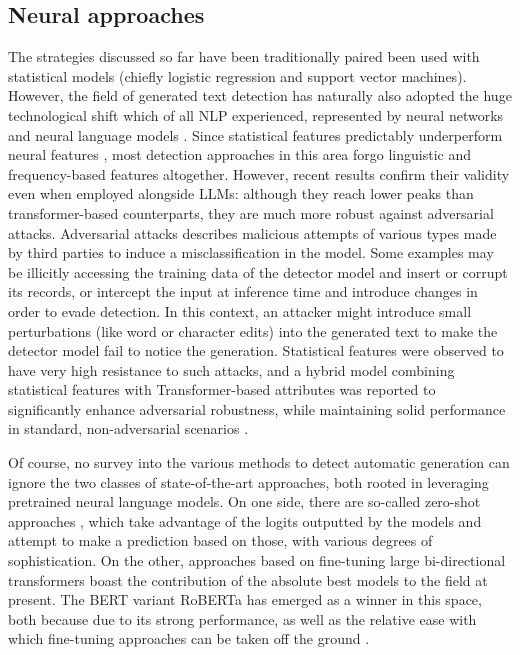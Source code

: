\subsection{Neural approaches}

The strategies discussed so far have been traditionally paired been used with statistical models (chiefly logistic regression and support vector machines).
However, the field of generated text detection has naturally also adopted the huge technological shift which of all NLP experienced, represented by neural networks and neural language models \citep{papers2024nlp}.
Since statistical features predictably underperform neural features \citep{crothers2022adversarial}, most detection approaches in this area forgo linguistic and frequency-based features altogether.
However, recent results confirm their validity even when employed alongside LLMs: although they reach lower peaks than transformer-based counterparts, they are much more robust against adversarial attacks.
Adversarial attacks describes malicious attempts of various types made by third parties to induce a misclassification in the model.
Some examples may be illicitly accessing the training data of the detector model and insert or corrupt its records, or intercept the input at inference time and introduce changes in order to evade detection.
In this context, an attacker might introduce small perturbations (like word or character edits) into the generated text to make the detector model fail to notice the generation.
Statistical features were observed to have very high resistance to such attacks, and a hybrid model combining statistical features with Transformer-based attributes was reported to significantly enhance adversarial robustness, while maintaining solid performance in standard, non-adversarial scenarios \citep{crothers2022adversarial}.

Of course, no survey into the various methods to detect automatic generation can ignore the two classes of state-of-the-art approaches, both rooted in leveraging pretrained neural language models.
On one side, there are so-called zero-shot approaches \citep{zellers2020defendingneuralfakenews}, which take advantage of the logits outputted by the models and attempt to make a prediction based on those, with various degrees of sophistication.
On the other, approaches based on fine-tuning large bi-directional transformers \citep{solaiman2019release} boast the contribution of the absolute best models to the field at present.
The BERT variant RoBERTa \citep{liu2019robertarobustlyoptimizedbert} has emerged as a winner in this space, both because due to its strong performance, as well as the relative ease with which fine-tuning approaches can be taken off the ground \citep{radford2019dataset}.

